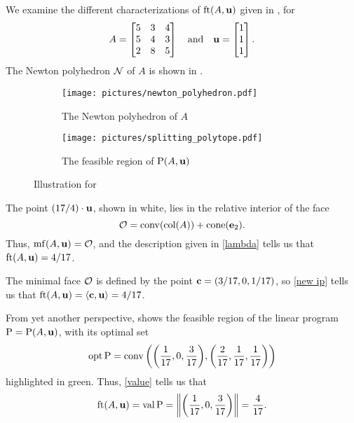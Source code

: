 \documentclass{amsart}
\begin{document}
\begin{example}\label{ex: ft}
   We examine the different characterizations of $\operatorname{ft}(A, \mathbf{u})$ given in , for
   \[A=\begin{bmatrix}5&3&4\\ 5&4&3\\ 2&8&5\end{bmatrix} \quad \text{and} \quad \mathbf{u} =
      \begin{bmatrix} 1 \\ 1\\ 1 \end{bmatrix}.\]
   The Newton polyhedron $\mathcal{N}$ of $A$ is shown in .
   \begin{figure}
   \centering
   \begin{subfigure}{.48\textwidth}
      \centering
      \texttt{[image: pictures/newton\_polyhedron.pdf]}\\[1.4mm]
      \caption{The Newton polyhedron of $A$}
      \label{fig: newton polyhedron}
   \end{subfigure}
   \begin{subfigure}{.48\textwidth}
      \centering
      \texttt{[image: pictures/splitting\_polytope.pdf]}
      \caption{The feasible region of $\mathrm{P}(A,\mathbf{u})$}
      \label{fig: splitting polytope}
   \end{subfigure}
      \caption{Illustration for }
   \label{fig: newton polyhedron and splitting polytope}
   \end{figure}
   The point $(17/4)\cdot \mathbf{u}$, shown in white, lies in the relative interior of the face
   \[\mathcal{O} = \operatorname{conv}(\operatorname{col}(A)) + \operatorname{cone}(\mathbf{e}_2).\]
   Thus, $\operatorname{mf}(A,\mathbf{u}) = \mathcal{O}$, and the description given in \ref{lambda} tells us that $\operatorname{ft}(A, \mathbf{u}) = 4/17$.

   The minimal face $\mathcal{O}$ is defined by the point $\mathbf{c} = (3/17, 0, 1/17)$, so \ref{new ip} tells us that
   $\operatorname{ft}(A, \mathbf{u}) = \langle \mathbf{c}, \mathbf{u} \rangle = 4/17$.

   From yet another perspective,  shows the feasible region of the linear program $\mathrm{P} = \mathrm{P}(A,\mathbf{u})$, with its optimal set
   \[\operatorname{opt} \mathrm{P} = \operatorname{conv}\bigg(\bigg(\frac1{17}, 0, \frac3{17}\bigg),\bigg(\frac2{17}, \frac1{17}, \frac1{17}\bigg)\bigg)\]
   highlighted in green.
   Thus, \ref{value} tells us that
   \[\operatorname{ft}(A, \mathbf{u}) = \operatorname{val} \mathrm{P} = \bigg\|\bigg(\frac1{17}, 0, \frac3{17}\bigg)\bigg\| = \frac4{17}.\]
\end{example}
\end{document}
